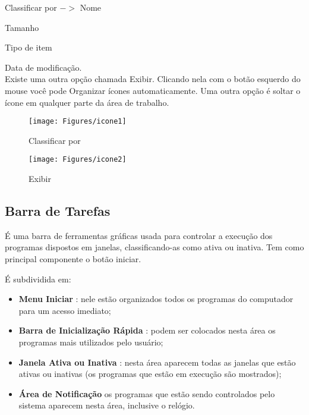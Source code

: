 \documentclass[hidelinks,12pt]{article}
\begin{document}
	Classificar por $->$ Nome

	 \hspace{3.6cm}Tamanho

	 \hspace{3.6cm}Tipo de item

	 \hspace{3.6cm}Data de modificação.\\

	 Existe uma outra opção chamada Exibir. Clicando nela com o botão esquerdo do mouse você pode Organizar ícones automaticamente. Uma outra opção é soltar o ícone em qualquer parte da área de trabalho.


	\begin{figure}[!htbp]
		\centering
		\begin{minipage}[b]{0.45\textwidth}
			\texttt{[image: Figures/icone1]}
			\caption{Classificar por}
			\label{fig:classificar por}
		\end{minipage}
		\hfill
		\begin{minipage}[b]{0.53\textwidth}
			\texttt{[image: Figures/icone2]}
			\caption{Exibir}
			\label{fig:exibir}
		\end{minipage}
	\end{figure}

\subsection{Barra de Tarefas}

	É uma barra de ferramentas gráficas usada para controlar a execução dos programas dispostos em janelas, classificando-as como ativa ou inativa. Tem como principal componente o botão iniciar.

	É subdividida em:

\begin{itemize}
	\item \textbf{Menu Iniciar} : nele estão organizados todos os programas do computador para um acesso imediato;

	\item \textbf{Barra de Inicialização Rápida} : podem ser colocados nesta área os programas mais utilizados pelo usuário;

	\item \textbf{Janela Ativa ou Inativa} : nesta área aparecem todas as janelas que estão ativas ou inativas (os programas que estão em execução são mostrados);

	\item \textbf{Área de Notificação} os programas que estão sendo controlados pelo sistema aparecem nesta área, inclusive o relógio.

\end{itemize}
\end{document}
